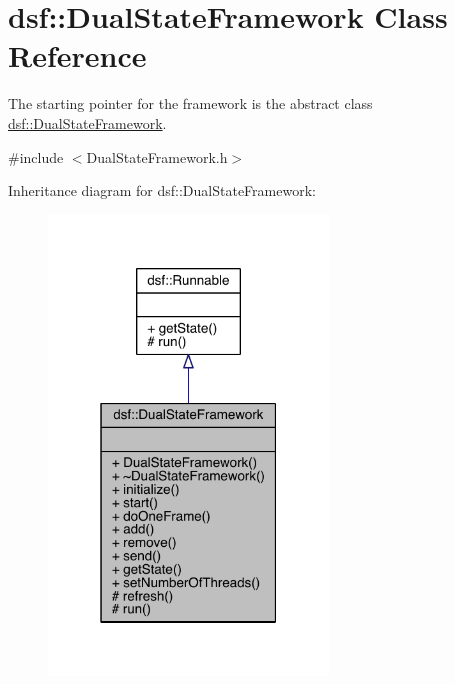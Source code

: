 \hypertarget{classdsf_1_1_dual_state_framework}{}\section{dsf\+:\+:Dual\+State\+Framework Class Reference}
\label{classdsf_1_1_dual_state_framework}


The starting pointer for the framework is the abstract class \hyperlink{classdsf_1_1_dual_state_framework}{dsf\+::\+Dual\+State\+Framework}.  




{\ttfamily \#include $<$Dual\+State\+Framework.\+h$>$}



Inheritance diagram for dsf\+:\+:Dual\+State\+Framework\+:\nopagebreak
\begin{figure}[H]
\begin{center}
\leavevmode
\includegraphics[width=211pt]{classdsf_1_1_dual_state_framework__inherit__graph}
\end{center}
\end{figure}
